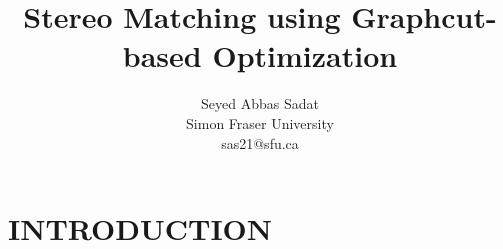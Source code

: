 \documentclass[letterpaper, 10 pt, conference]{ieeeconf}  %
\title{\LARGE \bf
Stereo Matching using Graphcut-based Optimization}
\author{Seyed Abbas Sadat\\
Simon Fraser University\\
sas21@sfu.ca%
}
\begin{document}
\maketitle
\thispagestyle{empty}
\pagestyle{empty}

\begin{abstract}
\end{abstract}

\section{INTRODUCTION}

 

\end{document}
